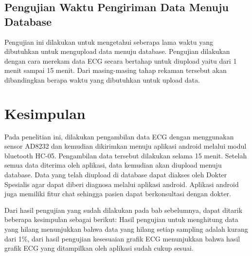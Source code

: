 \documentclass[conference]{IEEEtran}
\begin{document}
	\subsection{Pengujian Waktu Pengiriman Data Menuju Database}
	\vspace{1ex}
	Pengujian ini dilakukan untuk mengetahui seberapa lama waktu yang dibutuhkan untuk mengupload data menuju database. Pengujian dilakukan dengan cara merekam data ECG secara bertahap untuk diupload yaitu dari 1 menit sampai 15 menit. Dari masing-masing tahap rekaman tersebut akan dibandingkan berapa waktu yang dibutuhkan untuk upload data.
	
	\section{Kesimpulan}
	Pada penelitian ini, dilakukan pengambilan data ECG dengan menggunakan sensor AD8232 dan kemudian dikirimkan menuju aplikasi android melalui modul bluetooth HC-05. Pengambilan data tersebut dilakukan selama 15 menit. Setelah semua data diterima oleh aplikasi, data kemudian akan diupload menuju database. Data yang telah diupload di database dapat diakses oleh Dokter Spesialis agar dapat diberi diagnosa melalui aplikasi android. Aplikasi android juga memiliki fitur chat sehingga pasien dapat berkonsultasi dengan dokter.
	
	Dari hasil pengujian yang sudah dilakukan pada bab sebelumnya, dapat ditarik beberapa kesimpulan sebagai berikut:
	Hasil pengujian untuk menghitung data yang hilang menunjukkan bahwa data yang hilang setiap sampling adalah kurang dari 1\%,	
	dari hasil pengujian kesesuaian grafik ECG menunjukkan bahwa hasil grafik ECG yang ditampilkan oleh aplikasi sudah cukup sesuai.
		
	
	\vspace{1ex}
	
	
	
\end{document}
